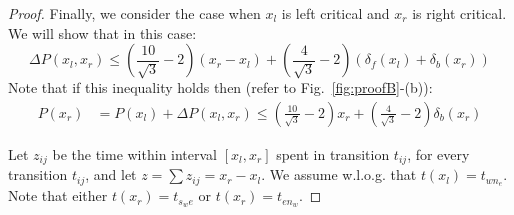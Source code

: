 \begin{proof}



Finally, we consider the case when $x_l$ is left critical and $x_r$ is right
critical. We will show that in this case:
\begin{equation}
\label{eq:keyineq0}
\Delta P(x_l,x_r) \leq \left(\frac{10}{\sqrt{3}}-2\right)(x_r - x_l) + \left(\frac{4}{\sqrt{3}}-2\right)(\delta_f(x_l) + \delta_b(x_r))
\end{equation}
Note that if this inequality holds then (refer to Fig.~\ref{fig:proofB}-(b)):
\begin{align*}
P(x_r) & = P(x_l) + \Delta P(x_l,x_r) \leq \left(\frac{10}{\sqrt{3}}-2\right)x_r + \left(\frac{4}{\sqrt{3}}-2\right)\delta_b(x_r)
\end{align*}

Let $z_{ij}$ be the time within
interval $[x_l,x_r]$ spent in transition $t_{ij}$, for every transition $t_{ij}$,
and let $z = \sum z_{ij} = x_r-x_l$.
We assume w.l.o.g. that $t(x_l) = t_{wn_e}$. Note that either
$t(x_r) = t_{s_we}$ or $t(x_r) = t_{en_w}$.


\end{proof}
